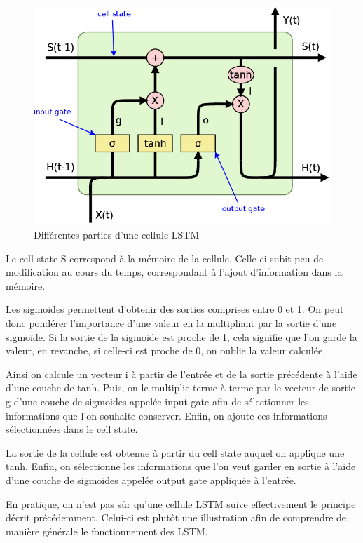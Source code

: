 \begin{figure}[h!]
\begin{center}
\includegraphics[scale=0.2]{images/chapter6/LSTM_article_gates.png}
\caption{Différentes parties d'une cellule LSTM}
\label{cellule LSTM gates}
\end{center}
\end{figure}

Le cell state S correspond à la mémoire de la cellule. Celle-ci subit peu de modification au cours du temps, correspondant à l'ajout d'information dans la mémoire.

Les sigmoides permettent d'obtenir des sorties comprises entre 0 et 1. On peut donc pondérer l'importance d'une valeur en la multipliant par la sortie d'une sigmoïde. Si la sortie de la sigmoide est proche de 1, cela signifie que l'on garde la valeur, en revanche, si celle-ci est proche de 0, on oublie la valeur calculée.

Ainsi on calcule un vecteur i à partir de l'entrée et de la sortie précédente à l'aide d'une couche de tanh. Puis, on le multiplie terme à terme par le vecteur de sortie g d'une couche de sigmoides appelée input gate afin de sélectionner les informations que l'on souhaite conserver. Enfin, on ajoute ces informations sélectionnées dans le cell state. 

La sortie de la cellule est obtenue à partir du cell state auquel on applique une tanh. Enfin, on sélectionne les informations que l'on veut garder en sortie à l'aide d'une couche de sigmoides appelée output gate appliquée à l'entrée.


En pratique, on n'est pas sûr qu'une cellule LSTM suive effectivement le principe décrit précédemment. Celui-ci est plutôt une illustration afin de comprendre de manière générale le fonctionnement des LSTM.

